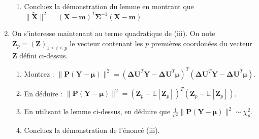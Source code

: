 \documentclass{../headers/td_upc}
\providecommand{\1}{\mathds{1}}
\begin{document}
\begin{enumerate}
\begin{enumerate}
		\item Concluez la démonstration du lemme en montrant que 
		$\|\tilde{\mathbf{X}}\|^2 = (\mathbf{X} - \mathbf{m})^T \mathbf{\Sigma}^{-1}(\mathbf{X} - \mathbf{m})$.
		\end{enumerate}
		\item On s'interesse maintenant au terme quadratique de (iii).
		On note $\mathbf{Z}_p = (\mathbf{Z})_{1 \leq i \leq p}$ le vecteur contenant
		les $p$ premières coordonées du vecteur $\mathbf{Z}$ défini ci-dessus.
		\begin{enumerate}
		\item Montrez :
		$
		\|\mathbf{P}(\mathbf{Y} - \boldsymbol{\mu}) \|^2 = 
		(\mathbf{\Delta}\mathbf{U}^T\mathbf{Y} - \mathbf{\Delta}\mathbf{U}^T\boldsymbol{\mu})^T
		(\mathbf{\Delta}\mathbf{U}^T\mathbf{Y} - \mathbf{\Delta}\mathbf{U}^T\boldsymbol{\mu})
		$.
		\item 
		En déduire :
		$
		\|\mathbf{P}(\mathbf{Y} - \boldsymbol{\mu}) \|^2 = 
		(\mathbf{Z}_p - \mathbb{E}[\mathbf{Z}_p])^T(\mathbf{Z}_p - \mathbb{E}[\mathbf{Z}_p])
		$.
		\item En utilisant le lemme ci-dessus, en déduire que 
		$\frac{1}{\sigma^2}\|\mathbf{P}(\mathbf{Y} - \boldsymbol{\mu}) \|^2 \sim \chi^2_{p}$.
		\item Concluez la démonstration de l'énoncé (iii).
		\end{enumerate}
	\end{enumerate}
\end{document}
